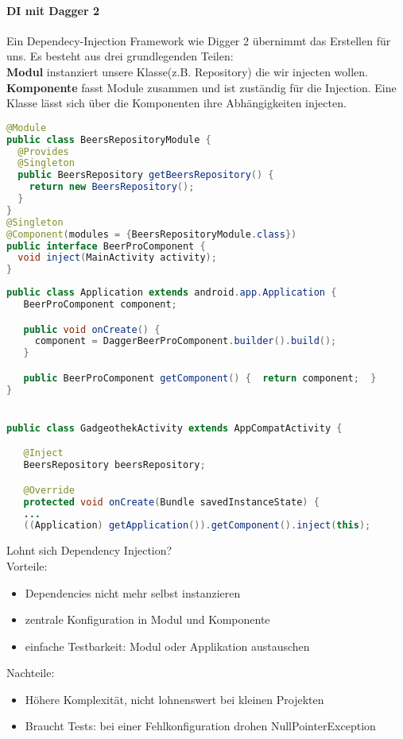 \paragraph{DI mit Dagger 2} 
Ein Dependecy-Injection Framework wie Digger 2 übernimmt das Erstellen für uns. Es besteht aus drei grundlegenden Teilen:\\
\textbf{Modul} instanziert unsere Klasse(z.B. Repository) die wir injecten wollen. \textbf{Komponente} fasst Module zusammen und ist zuständig für die Injection. Eine Klasse lässt sich über die Komponenten ihre Abhängigkeiten injecten.
\begin{lstlisting}[language=java]
@Module 
public class BeersRepositoryModule {
  @Provides
  @Singleton
  public BeersRepository getBeersRepository() {
    return new BeersRepository();
  } 
} 
@Singleton 
@Component(modules = {BeersRepositoryModule.class}) 
public interface BeerProComponent {
  void inject(MainActivity activity); 
} 
\end{lstlisting}
\begin{lstlisting}[language=java]
public class Application extends android.app.Application {
   BeerProComponent component;

   public void onCreate() {
     component = DaggerBeerProComponent.builder().build();
   }

   public BeerProComponent getComponent() {  return component;  }
}


public class GadgeothekActivity extends AppCompatActivity {

   @Inject
   BeersRepository beersRepository;

   @Override
   protected void onCreate(Bundle savedInstanceState) {
   ...
   ((Application) getApplication()).getComponent().inject(this);
\end{lstlisting}
Lohnt sich Dependency Injection? \\
Vorteile:
\begin{itemize}
\item Dependencies nicht mehr selbst instanzieren
\item zentrale Konfiguration in Modul und Komponente 
\item einfache Testbarkeit: Modul oder Applikation austauschen
\end{itemize}
Nachteile:
\begin{itemize}
\item Höhere Komplexität, nicht lohnenswert bei kleinen Projekten 
\item Braucht Tests: bei einer Fehlkonfiguration drohen NullPointerException 
\end{itemize}

